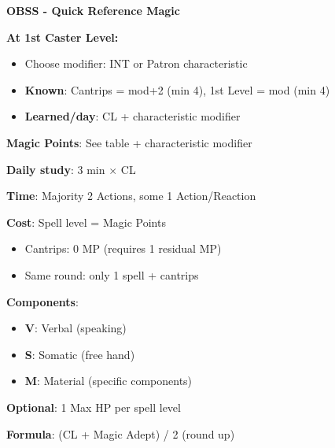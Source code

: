 \documentclass[10pt,a4paper,landscape]{article}
\begin{document}
	
	\begin{center}
		{\Huge\textbf{OBSS - Quick Reference Magic}}
	\end{center}
	
	\begin{multicols}{3}
		
		
		\begin{tcolorbox}[title=INITIAL SETUP]
			\textbf{At 1st Caster Level:}
			\begin{itemize}[leftmargin=*,noitemsep]
				\item Choose modifier: INT or Patron characteristic
				\item \textbf{Known}: Cantrips = mod+2 (min 4), 1st Level = mod (min 4)
				\item \textbf{Learned/day}: CL + characteristic modifier
			\end{itemize}
			
			\textbf{Magic Points}: See table + characteristic modifier
			
			\textbf{Daily study}: 3 min $\times$ CL
		\end{tcolorbox}
		
		\begin{tcolorbox}[title=CASTING SPELLS]
			\textbf{Time}: Majority 2 Actions, some 1 Action/Reaction
			
			\textbf{Cost}: Spell level = Magic Points
			\begin{itemize}[leftmargin=*,noitemsep]
				\item Cantrips: 0 MP (requires 1 residual MP)
				\item Same round: only 1 spell + cantrips
			\end{itemize}
			
			\textbf{Components}:
			\begin{itemize}[leftmargin=*,noitemsep]
				\item \textbf{V}: Verbal (speaking)
				\item \textbf{S}: Somatic (free hand)
				\item \textbf{M}: Material (specific components)
			\end{itemize}
			
			\textbf{Optional}: 1 Max HP per spell level
		\end{tcolorbox}
		
		\begin{tcolorbox}[title=MAXIMUM SPELL LEVEL]
			\textbf{Formula}: (CL + Magic Adept) / 2 (round up)
			

\end{tcolorbox}
\end{multicols}
\end{document}
